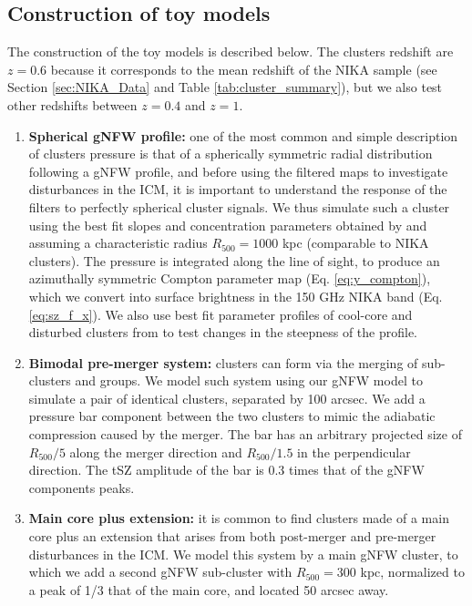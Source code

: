 \documentclass[twocolumn,traditabstract]{aa}
\begin{document}
\subsection{Construction of toy models}
The construction of the toy models is described below. The clusters redshift are $z=0.6$ because it corresponds to the mean redshift of the NIKA sample (see Section \ref{sec:NIKA_Data} and Table \ref{tab:cluster_summary}), but we also test other redshifts between $z=0.4$ and $z=1$.
\begin{enumerate}
\item {\bf Spherical gNFW profile:} one of the most common and simple description of clusters pressure is that of a spherically symmetric radial distribution following a gNFW \citep{Nagai2007} profile, and before using the filtered maps to investigate disturbances in the ICM, it is important to understand the response of the filters to perfectly spherical cluster signals. We thus simulate such a cluster using the best fit slopes and concentration parameters obtained by \cite{Planck2013V} and assuming a characteristic radius $R_{500} = 1000$ kpc (comparable to NIKA clusters). The pressure is integrated along the line of sight, to produce an azimuthally symmetric Compton parameter map (Eq. \ref{eq:y_compton}), which we convert into surface brightness in the 150 GHz NIKA band (Eq. \ref{eq:sz_f_x}). We also use best fit parameter profiles of cool-core and disturbed clusters from \cite{Arnaud2010} to test changes in the steepness of the profile.
\item {\bf Bimodal pre-merger system:} clusters can form via the merging of sub-clusters and groups. We model such system using our gNFW model to simulate a pair of identical clusters, separated by 100 arcsec. We add a pressure bar component between the two clusters to mimic the adiabatic compression caused by the merger. The bar has an arbitrary projected size of $R_{500}/5$ along the merger direction and $R_{500}/1.5$ in the perpendicular direction. The tSZ amplitude of the bar is 0.3 times that of the gNFW components peaks.
\item {\bf Main core plus extension:} it is common to find clusters made of a main core plus an extension that arises from both post-merger and pre-merger disturbances in the ICM. We model this system by a main gNFW cluster, to which we add a second gNFW sub-cluster with $R_{500} = 300$ kpc, normalized to a peak of 1/3 that of the main core, and located 50 arcsec away.

\end{enumerate}
\end{document}
